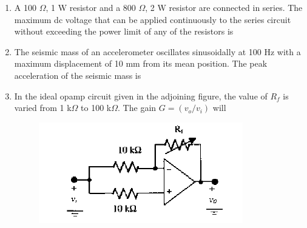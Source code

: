 \documentclass[journal,12pt,onecolumn]{IEEEtran}
\theoremstyle{remark}
\begin{document}
\begin{enumerate}
\hfill{}
\begin{enumerate}
\end{enumerate}

\item A 100 $\Omega$, 1 W resistor and a 800 $\Omega$, 2 W resistor are connected in series. The maximum dc voltage that can be applied continuously to the series circuit without exceeding the power limit of any of the resistors is

\hfill{}
\begin{enumerate}
\end{enumerate}

\item The seismic mass of an accelerometer oscillates sinusoidally at 100 Hz with a maximum displacement of 10 mm from its mean position. The peak acceleration of the seismic mass is

\hfill{}
\begin{enumerate}
\end{enumerate}

\item In the ideal opamp circuit given in the adjoining figure, the value of $R_f$ is varied from 1 k$\Omega$ to 100 k$\Omega$. The gain $G = (v_o/v_i)$ will
\begin{figure}[h]
    \centering
    \includegraphics[scale=0.75]{q18}
    \caption*{}
    \label{fig:placeholder}
\end{figure}


\end{enumerate}
\end{document}
